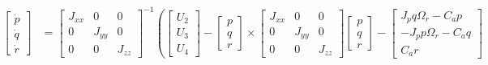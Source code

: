 \begin{small}
\begin{align*}
\begin{bmatrix} \dot{p} \\ \dot{q} \\ \dot{r} \end{bmatrix}
&=
\begin{bmatrix}
J_{xx} & 0 & 0 \\
0 & J_{yy} & 0 \\
0 & 0 & J_{zz}
\end{bmatrix}^{-1}
\left(
\begin{bmatrix} U_2 \\ U_3 \\ U_4 \end{bmatrix}
-
\begin{bmatrix} p \\ q \\ r \end{bmatrix}
\times
\begin{bmatrix}
J_{xx} & 0 & 0 \\
0 & J_{yy} & 0 \\
0 & 0 & J_{zz}
\end{bmatrix}
\begin{bmatrix} p \\ q \\ r \end{bmatrix}
-
\begin{bmatrix}
J_p q \Omega_r - C_a p \\
- J_p p \Omega_r - C_a q \\
C_a r
\end{bmatrix}

\end{align*}
\end{small}
